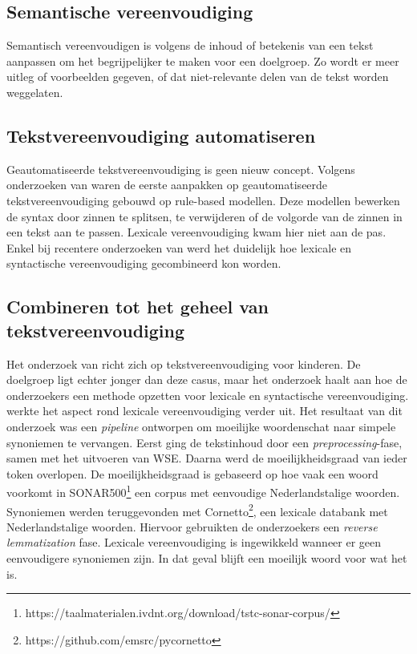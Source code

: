 \subsection{Semantische vereenvoudiging}

Semantisch vereenvoudigen is volgens \textcite{Siddharthan2006} de inhoud of betekenis van een tekst aanpassen om het begrijpelijker te maken voor een doelgroep. Zo wordt er meer uitleg of voorbeelden gegeven, of dat niet-relevante delen van de tekst worden weggelaten. 

\subsection{Tekstvereenvoudiging automatiseren}

Geautomatiseerde tekstvereenvoudiging is geen nieuw concept. Volgens onderzoeken van \textcite{Canning2000, Siddharthan2006} waren de eerste aanpakken op geautomatiseerde tekstvereenvoudiging gebouwd op rule-based modellen. Deze modellen bewerken de syntax door zinnen te splitsen, te verwijderen of de volgorde van de zinnen in een tekst aan te passen. Lexicale vereenvoudiging kwam hier niet aan de pas. Enkel bij recentere onderzoeken van \textcite{Coster2011, Bulte2018} werd het duidelijk hoe lexicale en syntactische vereenvoudiging gecombineerd kon worden.

\subsection{Combineren tot het geheel van tekstvereenvoudiging}

Het onderzoek van \textcite{DeBelder2010} richt zich op tekstvereenvoudiging voor kinderen. De doelgroep ligt echter jonger dan deze casus, maar het onderzoek haalt aan hoe de onderzoekers een methode opzetten voor lexicale en syntactische vereenvoudiging. \textcite{Bulte2018} werkte het aspect rond lexicale vereenvoudiging verder uit. Het resultaat van dit onderzoek was een \textit{pipeline} ontworpen om moeilijke woordenschat naar simpele synoniemen te vervangen. Eerst ging de tekstinhoud door een \textit{preprocessing}-fase, samen met het uitvoeren van WSE. Daarna werd de moeilijkheidsgraad van ieder token overlopen. De moeilijkheidsgraad is gebaseerd op hoe vaak een woord voorkomt in SONAR500\footnote{https://taalmaterialen.ivdnt.org/download/tstc-sonar-corpus/} een corpus met eenvoudige Nederlandstalige woorden. Synoniemen werden teruggevonden met Cornetto\footnote{https://github.com/emsrc/pycornetto}, een lexicale databank met Nederlandstalige woorden. Hiervoor gebruikten de onderzoekers een \textit{reverse lemmatization} fase. Lexicale vereenvoudiging is ingewikkeld wanneer er geen eenvoudigere synoniemen zijn. In dat geval blijft een moeilijk woord voor wat het is.

